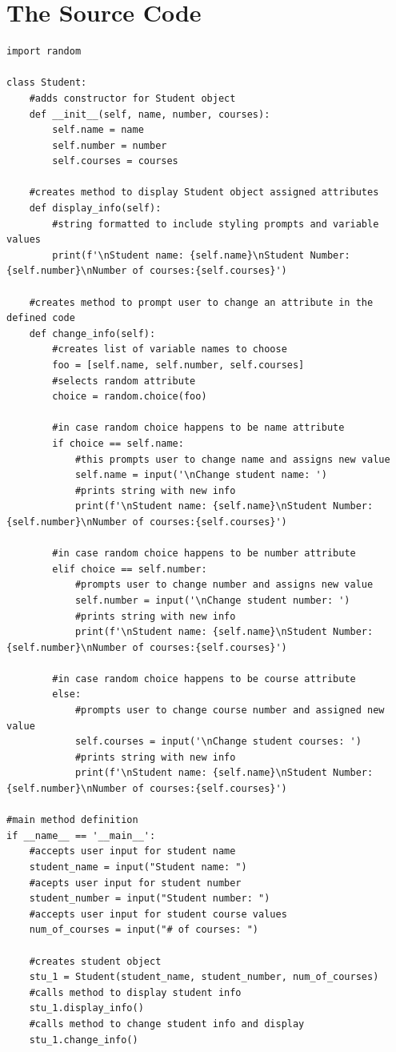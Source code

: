 \documentclass{article}
\begin{document}
\section*{The Source Code}
\begin{lstlisting}
import random

class Student:
    #adds constructor for Student object
    def __init__(self, name, number, courses):
        self.name = name
        self.number = number
        self.courses = courses

    #creates method to display Student object assigned attributes
    def display_info(self):
        #string formatted to include styling prompts and variable values
        print(f'\nStudent name: {self.name}\nStudent Number:{self.number}\nNumber of courses:{self.courses}')

    #creates method to prompt user to change an attribute in the defined code
    def change_info(self):
        #creates list of variable names to choose
        foo = [self.name, self.number, self.courses]
        #selects random attribute
        choice = random.choice(foo)

        #in case random choice happens to be name attribute
        if choice == self.name:
            #this prompts user to change name and assigns new value
            self.name = input('\nChange student name: ')
            #prints string with new info
            print(f'\nStudent name: {self.name}\nStudent Number:{self.number}\nNumber of courses:{self.courses}')

        #in case random choice happens to be number attribute
        elif choice == self.number:
            #prompts user to change number and assigns new value
            self.number = input('\nChange student number: ')
            #prints string with new info
            print(f'\nStudent name: {self.name}\nStudent Number:{self.number}\nNumber of courses:{self.courses}')

        #in case random choice happens to be course attribute
        else:
            #prompts user to change course number and assigned new value
            self.courses = input('\nChange student courses: ')
            #prints string with new info
            print(f'\nStudent name: {self.name}\nStudent Number:{self.number}\nNumber of courses:{self.courses}')

#main method definition
if __name__ == '__main__':
    #accepts user input for student name
    student_name = input("Student name: ")
    #acepts user input for student number
    student_number = input("Student number: ")
    #accepts user input for student course values
    num_of_courses = input("# of courses: ")

    #creates student object
    stu_1 = Student(student_name, student_number, num_of_courses)
    #calls method to display student info
    stu_1.display_info()
    #calls method to change student info and display
    stu_1.change_info()
\end{lstlisting}
\end{document}
